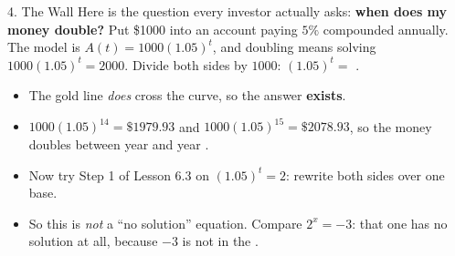 \documentclass[10pt]{article}
\begin{document}
\boxguard[30]
\begin{notesbox}{4. The Wall}
Here is the question every investor actually asks: \textbf{when does my money double?} Put \$1000 into
an account paying $5\%$ compounded annually. The model is $A(t)=1000(1.05)^{t}$, and doubling means
solving $1000(1.05)^{t}=2000$. Divide both sides by $1000$: \; $(1.05)^{t}=$ .

\vspace{3pt}

\begin{center}
\begin{minipage}[c]{0.46\linewidth}
\centering
{}
\end{minipage}
\begin{minipage}[c]{0.50\linewidth}
\small
\begin{itemize}[leftmargin=1.3em, itemsep=2pt]
  \item The gold line \emph{does} cross the curve, so the answer \textbf{exists}.
  \item $1000(1.05)^{14}=\$1979.93$ and $1000(1.05)^{15}=\$2078.93$, so the money doubles between year
         and year .
  \item Now try Step 1 of Lesson 6.3 on $(1.05)^{t}=2$: rewrite both sides over one base.
  \item So this is \emph{not} a ``no solution'' equation. Compare $2^{x}=-3$: that one has no solution
        at all, because $-3$ is not in the .
\end{itemize}
\end{minipage}
\end{center}


\end{notesbox}
\end{document}
